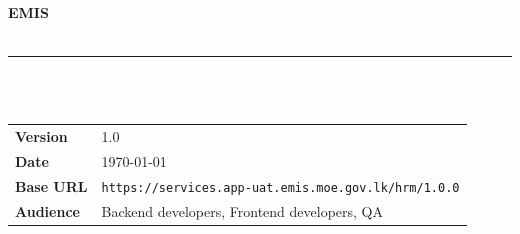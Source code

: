 \begin{titlepage}
  \pagecolor{cnavy}\color{white}
  \vspace*{4cm}
  \begin{flushleft}\hspace{1.8cm}
    {\fontsize{52}{56}\selectfont\bfseries EMIS}\\[0.3em]
    \\[2.8em]
    \hspace{1.8cm}\textcolor{caccent}{\rule{9cm}{2.5pt}}\\[1.6em]
    \hspace{1.8cm}{\LARGE\bfseries API Reference}\\[0.4em]
  \end{flushleft}
  \vfill
  \begin{flushleft}\hspace{1.8cm}
    \renewcommand{\arraystretch}{1.6}
    \begin{tabular}{@{} l l @{}}
      \textbf{Version}  & 1.0 \\
      \textbf{Date}     & \today \\
      \textbf{Base URL} & \texttt{\small https://services.app-uat.emis.moe.gov.lk/hrm/1.0.0} \\
      \textbf{Audience} & Backend developers, Frontend developers, QA \\
    \end{tabular}
  \end{flushleft}
  \vspace{2cm}
\end{titlepage}
\pagecolor{white}\color{black}
